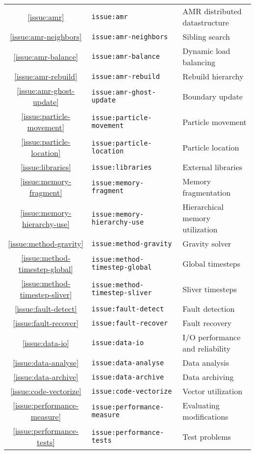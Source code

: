 \documentclass{article}
\begin{document}
\newcommand{\REF}[1]{\ref{#1}}
\newcommand{\TAG}[1]{\texttt{#1}}

\begin{tabular}{c|l|l}
\REF{issue:amr} & \TAG{issue:amr} & AMR distributed datastructure \\
\REF{issue:amr-neighbors} & \TAG{issue:amr-neighbors} & Sibling search \\
\REF{issue:amr-balance} & \TAG{issue:amr-balance} & Dynamic load balancing \\
\REF{issue:amr-rebuild} & \TAG{issue:amr-rebuild} & Rebuild hierarchy \\
\REF{issue:amr-ghost-update} & \TAG{issue:amr-ghost-update} & Boundary update \\
\REF{issue:particle-movement} & \TAG{issue:particle-movement} & Particle movement \\
\REF{issue:particle-location} & \TAG{issue:particle-location} & Particle location \\
\REF{issue:libraries} & \TAG{issue:libraries} & External libraries \\
\REF{issue:memory-fragment} & \TAG{issue:memory-fragment} & Memory fragmentation \\
\REF{issue:memory-hierarchy-use} & \TAG{issue:memory-hierarchy-use} & Hierarchical memory utilization \\
\REF{issue:method-gravity} & \TAG{issue:method-gravity} & Gravity solver \\
\REF{issue:method-timestep-global} & \TAG{issue:method-timestep-global} & Global timesteps \\
\REF{issue:method-timestep-sliver} & \TAG{issue:method-timestep-sliver} & Sliver timesteps \\
\REF{issue:fault-detect} & \TAG{issue:fault-detect} & Fault detection \\
\REF{issue:fault-recover} & \TAG{issue:fault-recover} & Fault recovery \\
\REF{issue:data-io} & \TAG{issue:data-io} & I/O performance and reliability \\
\REF{issue:data-analyse} & \TAG{issue:data-analyse} & Data analysis \\
\REF{issue:data-archive} & \TAG{issue:data-archive} & Data archiving \\
\REF{issue:code-vectorize} & \TAG{issue:code-vectorize} & Vector utilization \\
\REF{issue:performance-measure} & \TAG{issue:performance-measure} & Evaluating modifications \\
\REF{issue:performance-tests} & \TAG{issue:performance-tests} & Test problems 
\end{tabular}
\end{document}
